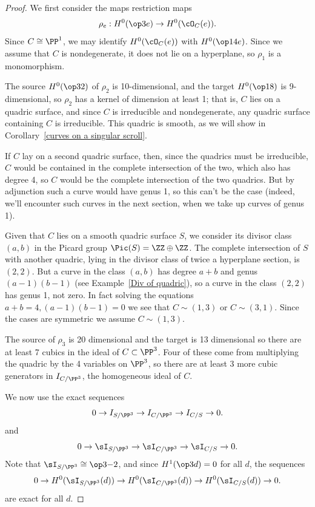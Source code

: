 \begin{proof}
We first consider the maps restriction maps
$$
\rho_e: H^0(\op3e)\to H^0(\cO_C(e)).
$$
Since $C\cong \PP^1$,
we may identify $H^0(\cO_C(e))$ with $H^0(\op1{4e})$.
 Since we assume that $C$ is nondegenerate, it does not lie on a hyperplane,
 so  $\rho_1$ is a monomorphism. 
 
The source $H^0(\op32)$ of $\rho_2$ is 10-dimensional, and the target $H^0(\op18)$ is
9-dimensional, so $\rho_2$ has a kernel of dimension at least 1; that is, $C$ lies on
a quadric surface, and since $C$ is irreducible and nondegenerate, any quadric surface containing
$C$ is irreducible. This quadric is smooth, as we will show in Corollary~\ref{curves on a singular scroll}.

If $C$ lay on a second quadric surface, then, since the quadrics must be irreducible,
$C$ would be contained in the complete intersection of the two, which also has degree 4, so 
$C$ would be the complete intersection of the two quadrics. But by adjunction such a curve would have genus 1, so this can't be the case (indeed, we'll encounter such curves in the next section, when we take up curves of genus 1).

Given that $C$ lies on a smooth quadric surface $S$, we consider its divisor class $(a,b)$ in the 
Picard group $\Pic(S) = \ZZ\oplus \ZZ$. The complete intersection of $S$ with another
quadric, lying in the divisor class of twice a hyperplane section, is $(2,2)$. But a curve
in the class $(a,b)$ has degree $a+b$ and genus $(a-1)(b-1)$ (see Example~\ref{Div of quadric}), so a curve in the class $(2,2)$
has genus 1, not zero. In fact solving the equations $a+b=4, (a-1)(b-1)=0$ we see that $C\sim (1,3)$ or $C\sim (3,1)$. Since the cases
are symmetric we assume $C\sim(1,3)$. 

The source of $\rho_3$ is 20 dimensional and the target is 13 dimensional so there are at least 7
cubics in the ideal of $C\subset \PP^3$. Four of these come from multiplying the quadric
by the 4 variables on $\PP^3$, so there are at least 3 more cubic generators in $I_{C/\PP^3}$,
 the homogeneous ideal of $C$. 

We now use the exact sequences 
$$
0\to I_{S/\PP^3} \to I_{C/\PP^3} \to I_{C/S} \to 0.
$$
and
$$
0\to \sI_{S/\PP^3} \to \sI_{C/\PP^3} \to \sI_{C/S} \to 0.
$$
Note that $\sI_{S/\PP^3} \cong \op3{-2}$, and since $H^1(\op3d)=0$ for all $d$, 
the sequences
$$
0\to H^0(\sI_{S/\PP^3}(d)) \to H^0(\sI_{C/\PP^3}(d)) \to H^0(\sI_{C/S}(d)) \to 0.
$$
are exact for all $d$. 


\end{proof}
